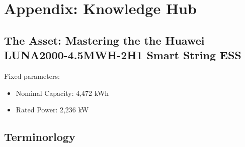 \section{Appendix: Knowledge Hub}

\subsection{The Asset: Mastering the the Huawei LUNA2000-4.5MWH-2H1 Smart String ESS}
Fixed parameters:
\begin{itemize}
    \item Nominal Capacity: 4,472 kWh
    \item Rated Power: 2,236 kW
\end{itemize}



\subsection{Terminorlogy}
